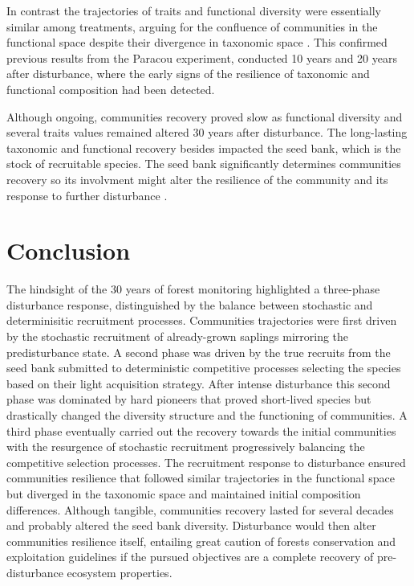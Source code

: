 \documentclass[fleqn,10pt]{ArtEcoFoG} %
\begin{document}
In contrast the trajectories of traits and functional diversity were
essentially similar among treatments, arguing for the confluence of
communities in the functional space despite their divergence in
taxonomic space \citep{Fukami2005}. This confirmed previous results from
the Paracou experiment, conducted 10 years \citep{Molino2001} and 20
years \citep{Baraloto2012a} after disturbance, where the early signs of
the resilience of taxonomic and functional composition had been
detected.

Although ongoing, communities recovery proved slow as functional
diversity and several traits values remained altered 30 years after
disturbance. The long-lasting taxonomic and functional recovery besides
impacted the seed bank, which is the stock of recruitable species. The
seed bank significantly determines communities recovery so its
involvment might alter the resilience of the community and its response
to further disturbance \citep{Norden2009}.

\section{Conclusion}\label{conclusion}

The hindsight of the 30 years of forest monitoring highlighted a
three-phase disturbance response, distinguished by the balance between
stochastic and determinisitic recruitment processes. Communities
trajectories were first driven by the stochastic recruitment of
already-grown saplings mirroring the predisturbance state. A second
phase was driven by the true recruits from the seed bank submitted to
deterministic competitive processes selecting the species based on their
light acquisition strategy. After intense disturbance this second phase
was dominated by hard pioneers that proved short-lived species but
drastically changed the diversity structure and the functioning of
communities. A third phase eventually carried out the recovery towards
the initial communities with the resurgence of stochastic recruitment
progressively balancing the competitive selection processes. The
recruitment response to disturbance ensured communities resilience that
followed similar trajectories in the functional space but diverged in
the taxonomic space and maintained initial composition differences.
Although tangible, communities recovery lasted for several decades and
probably altered the seed bank diversity. Disturbance would then alter
communities resilience itself, entailing great caution of forests
conservation and exploitation guidelines if the pursued objectives are a
complete recovery of pre-disturbance ecosystem properties.
\end{document}
